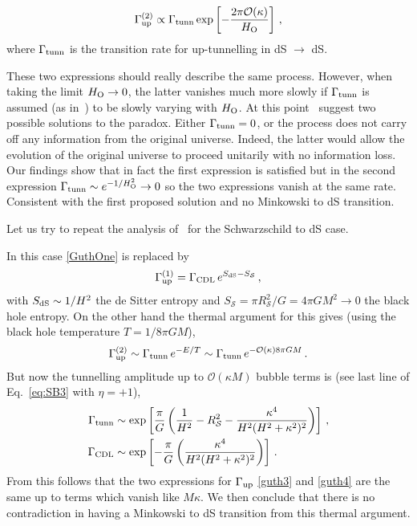 \documentclass[11pt,a4paper]{article}
\begin{document}
\begin{equation} 
\Gamma^{(2)}_{\rm up} \propto \Gamma_{\rm tunn} \exp\left[-\frac{2\pi \mathcal{O}(\kappa)}{H_{\rm O}}\right] \,,
\label{GuthTwo}
\end{equation} 
where $\Gamma_{\rm tunn}$ is the transition rate for up-tunnelling in dS $\rightarrow$ dS. 

These two expressions should really describe the same process. However, when taking the limit $H_{\rm O} \rightarrow 0$, the latter vanishes much more slowly if $\Gamma_{\rm tunn}$ is assumed (as in~\cite{GuthSusskind}) to be slowly varying with $H_{\rm O}$. At this point~\cite{GuthSusskind} suggest two possible solutions to the paradox. Either $\Gamma_{\rm tunn} = 0$, or the process does not carry off any information from the original universe. Indeed, the latter would allow the evolution of the original universe to proceed unitarily with no information loss. Our findings show that in fact the first expression is satisfied but in the second expression $\Gamma_{\rm tunn} \sim e^{-1/H_{\rm O}^2} \rightarrow 0$ so the two expressions vanish at the same rate. Consistent with the first proposed solution and no Minkowski to dS transition.

Let us try to repeat the analysis of~\cite{GuthSusskind} for the Schwarzschild to dS case.

In this case \eqref{GuthOne} is replaced by
\begin{equation}
\Gamma^{(1)}_{\rm up} = \Gamma_{\rm CDL}\,  e^{S_{\rm dS} - S_{\mathcal{S}}} \,,\label{guth3}
\end{equation}
with $S_{\rm dS} \sim 1/H^2$ the de Sitter entropy and $S_{\mathcal{S}} =\pi R^2_{\mathcal S}/G= 4\pi GM^2 \rightarrow 0$ the black hole entropy. On the other hand the thermal argument for this gives (using the black hole temperature $T = 1/8\pi G M$),
\begin{equation} 
\Gamma^{(2)}_{\rm up} \sim \Gamma_{\rm tunn}\, e^{-E/T} \sim \Gamma_{\rm tunn}\, e^{-\mathcal{O}(\kappa )8\pi GM}  \,.\label{guth4}
\end{equation}
But now the tunnelling amplitude up to $\mathcal{O}(\kappa M)$ bubble terms is (see last line of Eq.~\eqref{eq:SB3} with $\eta=+1$), 
\begin{align}  
\Gamma_{\rm tunn} & \sim \exp\left[\frac{\pi}{G} \left(\frac{1}{H^{2}} -R^2_{\mathcal S} -\frac{\kappa^{4}}{H^{2}(H^{2}+\kappa^{2})^{2}} \right)\right] \,, \nonumber \\ 
\Gamma_{\rm CDL} & \sim \exp\left[-\frac{\pi}{G} \left(\frac{ \kappa^{4}}{H^{2}(H^{2}+\kappa^{2})^{2}}\right)\right] \,.
\label{eq:2e} 
\end{align}
From this follows that the two expressions for $\Gamma_{\rm up}$ \eqref{guth3} and \eqref{guth4} are the same up to terms which vanish like $M\kappa$. We then conclude that there is no contradiction in having a Minkowski to dS transition from this thermal argument. 
\end{document}
